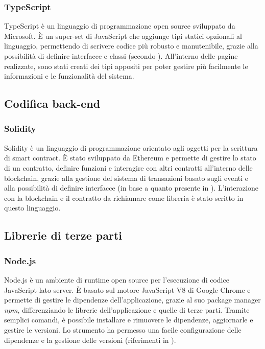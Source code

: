 \subsubsection{TypeScript}
TypeScript è un linguaggio di programmazione open source sviluppato da Microsoft. È un super-set di JavaScript che aggiunge tipi statici opzionali al linguaggio,
permettendo di scrivere codice più robusto e manutenibile, grazie alla possibilità di definire interfacce e classi (secondo \cite{site:react}).
All'interno delle pagine realizzate, sono stati creati dei tipi appositi per poter gestire più facilmente le informazioni e le funzionalità del sistema.

\subsection{Codifica back-end}

\subsubsection{Solidity}
Solidity è un linguaggio di programmazione orientato agli oggetti per la scrittura di smart contract. È stato sviluppato da Ethereum e permette di gestire
lo stato di un contratto, definire funzioni e interagire con altri contratti all'interno delle blockchain,
grazie alla gestione del sistema di transazioni basato sugli eventi e alla possibilità di definire interfacce (in base a quanto presente in \cite{site:solidity}).
L'interazione con la blockchain e il contratto da richiamare come libreria è stato scritto in questo linguaggio.

\subsection{Librerie di terze parti}

\subsubsection{Node.js}
Node.js è un ambiente di runtime open source per l'esecuzione di codice JavaScript lato server. È basato sul motore JavaScript V8 di Google Chrome e permette di gestire
le dipendenze dell'applicazione, grazie al suo package manager \textit{npm}, differenziando le librerie dell'applicazione e quelle di terze parti.
Tramite semplici comandi, è possibile installare e rimuovere le dipendenze, aggiornarle e gestire le versioni. 
Lo strumento ha permesso una facile configurazione delle dipendenze e la gestione delle versioni (riferimenti in \cite{site:node}).

